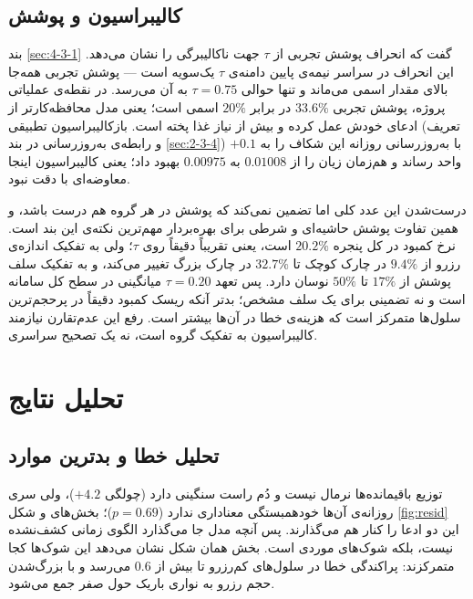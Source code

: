 \subsection{کالیبراسیون و پوشش}
\label{sec:4-4-3}

بند \ref{sec:4-3-1} گفت که انحراف پوشش تجربی از $\tau$ جهت ناکالیبرگی را نشان می‌دهد.
این انحراف در سراسر نیمه‌ی پایین دامنه‌ی $\tau$ یک‌سویه است — پوشش تجربی همه‌جا بالای
مقدار اسمی می‌ماند و تنها حوالی $\tau = 0.75$ به آن می‌رسد. در نقطه‌ی عملیاتی پروژه، پوشش تجربی $33.6\%$ در برابر $20\%$ اسمی است؛ یعنی مدل
محافظه‌کارتر از ادعای خودش عمل کرده و بیش از نیاز غذا پخته است. بازکالیبراسیون
تطبیقی (تعریف و رابطه‌ی به‌روزرسانی در بند
\ref{sec:2-3-4})
با به‌روزرسانی روزانه این شکاف را به $+0.1$ واحد رساند و هم‌زمان زیان  را از
$0.01008$ به $0.00975$ بهبود داد؛ یعنی کالیبراسیون اینجا معاوضه‌ای با دقت نبود.

درست‌شدن این عدد کلی اما تضمین نمی‌کند که پوشش در هر گروه هم درست باشد، و همین تفاوت
پوشش حاشیه‌ای و شرطی برای بهره‌بردار مهم‌ترین نکته‌ی این بند است. نرخ کمبود در کل پنجره
$20.2\%$ است، یعنی تقریباً دقیقاً روی $\tau$؛ ولی به تفکیک اندازه‌ی رزرو از $9.4\%$ در
چارک کوچک تا $32.7\%$ در چارک بزرگ تغییر می‌کند، و به تفکیک سلف پوشش از $17\%$ تا
$50\%$ نوسان دارد. پس تعهد $\tau = 0.20$ میانگینی در سطح کل سامانه است و نه تضمینی برای
یک سلف مشخص؛ بدتر آنکه ریسک کمبود دقیقاً در پرحجم‌ترین سلول‌ها متمرکز است که هزینه‌ی خطا
در آن‌ها بیشتر است. رفع این عدم‌تقارن نیازمند کالیبراسیون به تفکیک گروه است، نه یک
تصحیح سراسری.

\section{تحلیل نتایج}
\label{sec:4-5}

\subsection{تحلیل خطا و بدترین موارد}
\label{sec:4-5-1}

توزیع باقیمانده‌ها نرمال نیست و دُم راست سنگینی دارد (چولگی $+4.2$)، ولی سری روزانه‌ی
آن‌ها خودهمبستگی معناداری ندارد ($p = 0.69$)؛ بخش‌های  و
 شکل \ref{fig:resid} این دو ادعا را کنار هم می‌گذارند. پس آنچه مدل
جا می‌گذارد الگوی زمانی کشف‌نشده نیست، بلکه شوک‌های موردی است. بخش
 همان شکل نشان می‌دهد این شوک‌ها کجا متمرکزند: پراکندگی خطا در
سلول‌های کم‌رزرو تا بیش از $0.6$ می‌رسد و با بزرگ‌شدن حجم رزرو به نواری باریک حول صفر
جمع می‌شود.


